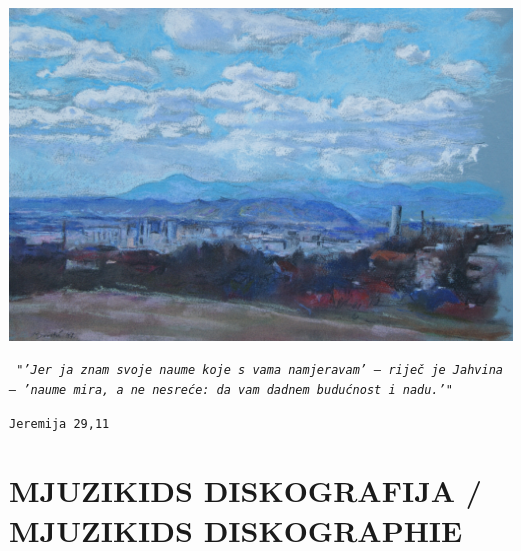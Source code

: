 \documentclass[a4paper,twoside, svgnames]{article}
\begin{document}
\newpage
\begin{center}
\includegraphics[width=\linewidth]{images/mihovil/c3_planovemira}

\vspace*{1mm}
\begin{center}

	\Large{\parbox{\linewidth}{
		\begin{center}
		{\Large
		\texttt{
			\textit{"'Jer ja znam svoje naume koje s vama namjeravam' – riječ je Jahvina – 'naume mira, a ne nesreće: da vam dadnem budućnost i nadu.'"}
			}
		}
		\end{center}
		\begin{center}
		{\Large
			\texttt{{\textemdash Jeremija 29,11}}
		}
		\end{center}
	}
}
\end{center}

\end{center}


\vfill

\newpage

\section*{MJUZIKIDS DISKOGRAFIJA / MJUZIKIDS DISKOGRAPHIE}
\end{document}
